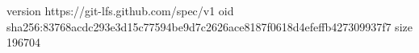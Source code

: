 version https://git-lfs.github.com/spec/v1
oid sha256:83768acdc293e3d15c77594be9d7c2626ace8187f0618d4efeffb427309937f7
size 196704
